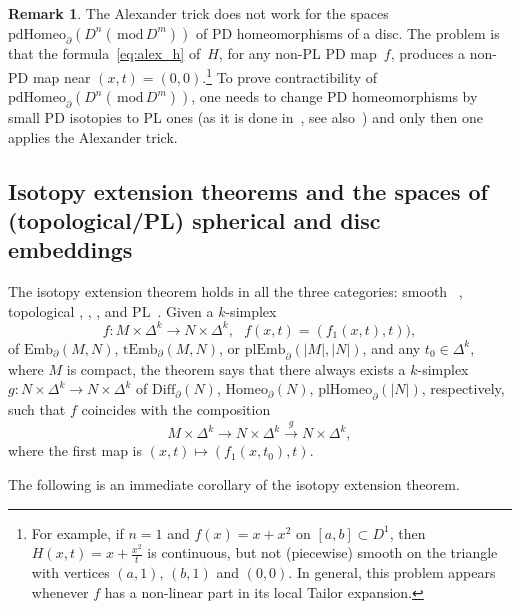 \documentclass[11pt]{amsart}
\theoremstyle{definition}
\newtheorem{remark}[theorem]{Remark}
\newcommand{\Embmn}{\mathrm{Emb}_\partial(D^m,D^n)}
\newcommand{\tEmbmn}{\mathrm{tEmb}_\partial(D^m,D^n)}
\newcommand{\plEmbmn}{\mathrm{plEmb}_\partial(D^m,D^n)}
\newcommand{\Emb}{\mathrm{Emb}}
\newcommand{\tEmb}{\mathrm{tEmb}}
\newcommand{\plEmb}{\mathrm{plEmb}}
\newcommand{\Diff}{\mathrm{Diff}}
\newcommand{\Homeo}{\mathrm{Homeo}}
\newcommand{\plHomeo}{\mathrm{plHomeo}}
\newcommand{\pdHomeo}{\mathrm{pdHomeo}}
\newcommand{\mmod}{\,\mathrm{mod}\,}
\numberwithin{equation}{section}
\begin{document}
\begin{remark}\label{s:alex_pd}
The Alexander trick does not work  for the spaces $\pdHomeo_\partial(D^n (\mmod D^m))$ of PD homeomorphisms of a disc. The problem is that the 
formula~\eqref{eq:alex_h} of~$H$, for any non-PL PD map~$f$,
produces a non-PD map near $(x,t)=(0,0)$.\footnote{For example, if $n=1$ and $f(x)=x+x^2$ on $[a,b]\subset D^1$, then $H(x,t)=x+\frac{x^2}t$ is continuous, but not (piecewise) smooth on the triangle with vertices $(a,1)$, $(b,1)$ and $(0,0)$. In general, this problem appears whenever $f$ has a non-linear part in its local Tailor expansion.} 
To prove contractibility of $\pdHomeo_\partial(D^n (\mmod D^m))$, one needs to change PD homeomorphisms by  small PD isotopies to  PL ones
(as it is done in~\cite{Whitehead}, see also~\cite{BLR_aut}) and only then one  applies the 
Alexander trick.
\end{remark}





\subsection{Isotopy extension theorems and the spaces of (topological/PL) spherical and disc embeddings}\label{ss:isot_ext}
The isotopy extension theorem holds in all the three categories: smooth~ \cite{Lima,Palais}, topological  \cite[Corollary~1.4]{EdwKirby}, \cite[Theorem~6.17]{Sieb_deform}, \cite{Wright}, and 
PL~\cite[Theorem~3, Corollary~3.2]{Hudson}. Given a $k$-simplex
\[
f\colon M\times\Delta^k\to N\times\Delta^k,\,\,\,\,
f(x,t)=(f_1(x,t),t)),
\]
 of $\Emb_\partial(M,N)$,  $\tEmb_\partial(M,N)$, or  $\plEmb_\partial(|M|,|N|)$, and any $t_0\in\Delta^k$, where $M$ is compact, the theorem
says that there always exists a $k$-simplex $g: N\times\Delta^k\to N\times \Delta^k$ of $\Diff_\partial(N)$, $\Homeo_\partial(N)$, 
$\plHomeo_\partial(|N|)$, respectively, such that $f$ coincides with the composition
\[
M\times\Delta^k\to N\times\Delta^k\xrightarrow{g} N\times\Delta^k,
\]
where the first map is $(x,t)\mapsto(f_1(x,t_0),t)$.

The following is an immediate corollary of the isotopy extension theorem. 
\end{document}
